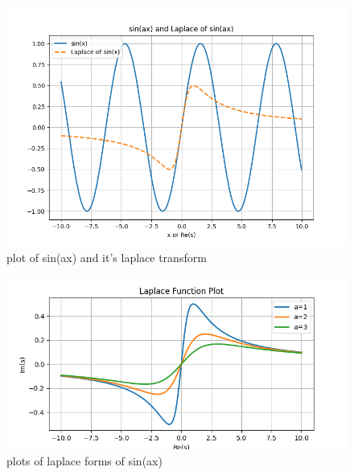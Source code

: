 \documentclass[journal,12pt,twocolumn]{IEEEtran}
\begin{document}
\begin{figure}[ht]
    \centering
    \includegraphics[width=\columnwidth]{2022/ES/13/figs/Figure_1.png}
    \caption{plot of sin(ax) and it's laplace transform}
    \label{fig:fig1_2022_es_13_054}
\end{figure}

\begin{figure}[ht]
    \centering
    \includegraphics[width=\columnwidth]{2022/ES/13/figs/Figure_2.png}
    \caption{plots of laplace forms of sin(ax)}
    \label{fig:fig2_2022_es_13_054}
\end{figure}

\end{document}
